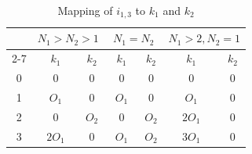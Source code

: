 \documentclass[lettersize,journal]{IEEEtran}
\begin{document}
\begin{table}[t]  
\begin{center} 
\centering   
\captionsetup{
  labelsep=newline, %
}
\renewcommand{\arraystretch}{1.5}  %
\caption{Mapping of $i_{1,3}$ to $k_1$ and $k_2$}  \label{tabmap}
\begin{tabular}{|c|c|c|c|c|c|c|}   
\hline  
\rowcolor{gray!20}
\multirow{2}{*}{} & \multicolumn{2}{c|}{$N_1>N_2>1$}& \multicolumn{2}{c|}{$N_1=N_2$}&  \multicolumn{2}{c|}{$N_1>2,N_2=1$}   \\ 
\cline{2-7}   
\rowcolor{gray!20}
\multirow{-2}{*}{$i_{1,3}$}&$k_1$&$k_2$&$k_1$&$k_2$&$k_1$&$k_2$\\
\hline 0&0&0&0&0&0&0\\
\hline 1&\ \ $O_1$\ \ &0&\ $O_1$\ &0&\ \ $O_1$\ \ &0\\
\hline 2&0&$O_2$&0&$O_2$& $2O_1$&0\\
\hline 3&$2O_1$&0&$O_1$&$O_2$& $3O_1$&0\\
\hline
\end{tabular}  
\end{center}
\vspace{-10 pt}
\end{table}
\end{document}

